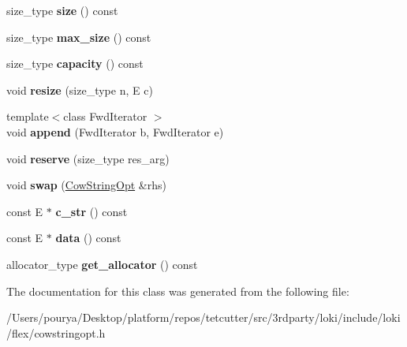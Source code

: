 \begin{DoxyCompactItemize}
\item 
\hypertarget{classCowStringOpt_a4ceb135aeb60b70a59bab353cd715f94}{}size\+\_\+type {\bfseries size} () const \label{classCowStringOpt_a4ceb135aeb60b70a59bab353cd715f94}

\item 
\hypertarget{classCowStringOpt_a6f7200ab67e8bc0765388e0de4df67b8}{}size\+\_\+type {\bfseries max\+\_\+size} () const \label{classCowStringOpt_a6f7200ab67e8bc0765388e0de4df67b8}

\item 
\hypertarget{classCowStringOpt_aa5f55fe278473ec351c595ed2325584d}{}size\+\_\+type {\bfseries capacity} () const \label{classCowStringOpt_aa5f55fe278473ec351c595ed2325584d}

\item 
\hypertarget{classCowStringOpt_a5e2e29abf05aa09d773c941d2ef61b34}{}void {\bfseries resize} (size\+\_\+type n, E c)\label{classCowStringOpt_a5e2e29abf05aa09d773c941d2ef61b34}

\item 
\hypertarget{classCowStringOpt_a6ee0d7f898f32144d5c627a68e834dfb}{}{\footnotesize template$<$class Fwd\+Iterator $>$ }\\void {\bfseries append} (Fwd\+Iterator b, Fwd\+Iterator e)\label{classCowStringOpt_a6ee0d7f898f32144d5c627a68e834dfb}

\item 
\hypertarget{classCowStringOpt_a06763a01c074a6722334871d91ef4438}{}void {\bfseries reserve} (size\+\_\+type res\+\_\+arg)\label{classCowStringOpt_a06763a01c074a6722334871d91ef4438}

\item 
\hypertarget{classCowStringOpt_ac6cfe616d8a89f8a261c1d5530ac4115}{}void {\bfseries swap} (\hyperlink{classCowStringOpt}{Cow\+String\+Opt} \&rhs)\label{classCowStringOpt_ac6cfe616d8a89f8a261c1d5530ac4115}

\item 
\hypertarget{classCowStringOpt_ae97eb95607bd5f9ef103cee8f358872e}{}const E $\ast$ {\bfseries c\+\_\+str} () const \label{classCowStringOpt_ae97eb95607bd5f9ef103cee8f358872e}

\item 
\hypertarget{classCowStringOpt_a47121e06e8ae6c6caeead5e2741ac0a0}{}const E $\ast$ {\bfseries data} () const \label{classCowStringOpt_a47121e06e8ae6c6caeead5e2741ac0a0}

\item 
\hypertarget{classCowStringOpt_a24a25e31227915beb2d07f53d56c2cc8}{}allocator\+\_\+type {\bfseries get\+\_\+allocator} () const \label{classCowStringOpt_a24a25e31227915beb2d07f53d56c2cc8}

\end{DoxyCompactItemize}


The documentation for this class was generated from the following file\+:\begin{DoxyCompactItemize}
\item 
/\+Users/pourya/\+Desktop/platform/repos/tetcutter/src/3rdparty/loki/include/loki/flex/cowstringopt.\+h\end{DoxyCompactItemize}

